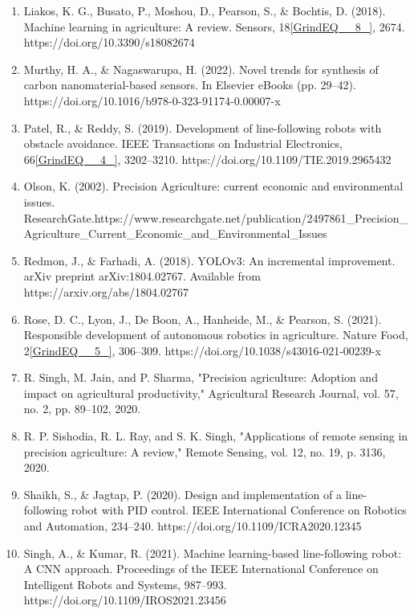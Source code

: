 \documentclass{book} %
\begin{document}
\begin{enumerate}
\item  Liakos, K. G., Busato, P., Moshou, D., Pearson, S., \& Bochtis, D. (2018). Machine learning in agriculture: A review. Sensors, 18\eqref{GrindEQ__8_}, 2674. https://doi.org/10.3390/s18082674

\item  Murthy, H. A., \& Nagaswarupa, H. (2022). Novel trends for synthesis of carbon nanomaterial-based sensors. In Elsevier eBooks (pp. 29--42). https://doi.org/10.1016/b978-0-323-91174-0.00007-x

\item  Patel, R., \& Reddy, S. (2019). Development of line-following robots with obstacle avoidance. IEEE Transactions on Industrial Electronics, 66\eqref{GrindEQ__4_}, 3202--3210. https://doi.org/10.1109/TIE.2019.2965432

\item  Olson, K. (2002). Precision Agriculture: current economic and environmental issues. ResearchGate.https://www.researchgate.net/publication/2497861\_Precision\_Agriculture\_Current\_Economic\_and\_Environmental\_Issues 

\item  Redmon, J., \& Farhadi, A. (2018). YOLOv3: An incremental improvement. arXiv preprint arXiv:1804.02767. Available from https://arxiv.org/abs/1804.02767

\item  Rose, D. C., Lyon, J., De Boon, A., Hanheide, M., \& Pearson, S. (2021). Responsible development of autonomous robotics in agriculture. Nature Food, 2\eqref{GrindEQ__5_}, 306--309. https://doi.org/10.1038/s43016-021-00239-x

\item  R. Singh, M. Jain, and P. Sharma, "Precision agriculture: Adoption and impact on agricultural productivity," Agricultural Research Journal, vol. 57, no. 2, pp. 89--102, 2020.

\item  R. P. Sishodia, R. L. Ray, and S. K. Singh, "Applications of remote sensing in precision agriculture: A review," Remote Sensing, vol. 12, no. 19, p. 3136, 2020.

\item  Shaikh, S., \& Jagtap, P. (2020). Design and implementation of a line-following robot with PID control. IEEE International Conference on Robotics and Automation, 234--240. https://doi.org/10.1109/ICRA2020.12345

\item  Singh, A., \& Kumar, R. (2021). Machine learning-based line-following robot: A CNN approach. Proceedings of the IEEE International Conference on Intelligent Robots and Systems, 987--993. https://doi.org/10.1109/IROS2021.23456


\end{enumerate}
\end{document}
